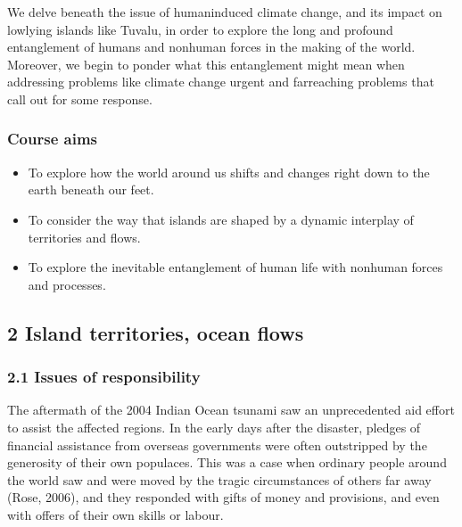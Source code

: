 \documentclass[letterpaper,10pt,english]{sphinxmanual}
\begin{document}
We delve beneath the issue of human\sphinxhyphen{}induced climate change, and its impact on low\sphinxhyphen{}lying islands like Tuvalu, in order to explore the long and profound entanglement of humans and non\sphinxhyphen{}human forces in the making of the world. Moreover, we begin to ponder what this entanglement might mean when addressing problems like climate change \textendash{} urgent and far\sphinxhyphen{}reaching problems that call out for some response.


\subsubsection{Course aims}
\label{\detokenize{content/session_00/Part_00_01:Course-aims}}\begin{itemize}
\item {} 
To explore how the world around us shifts and changes right down to the earth beneath our feet.

\item {} 
To consider the way that islands are shaped by a dynamic interplay of territories and flows.

\item {} 
To explore the inevitable entanglement of human life with non\sphinxhyphen{}human forces and processes.

\end{itemize}


\subsection{2 Island territories, ocean flows}
\label{\detokenize{content/session_00/Part_00_02:2-Island-territories,-ocean-flows}}\label{\detokenize{content/session_00/Part_00_02::doc}}

\subsubsection{2.1 Issues of responsibility}
\label{\detokenize{content/session_00/Part_00_02:2.1-Issues-of-responsibility}}
The aftermath of the 2004 Indian Ocean tsunami saw an unprecedented aid effort to assist the affected regions. In the early days after the disaster, pledges of financial assistance from overseas governments were often outstripped by the generosity of their own populaces. This was a case when ordinary people around the world saw and were moved by the tragic circumstances of others far away (Rose, 2006), and they responded with gifts of money and provisions, and even with offers of their own
skills or labour.
\end{document}
